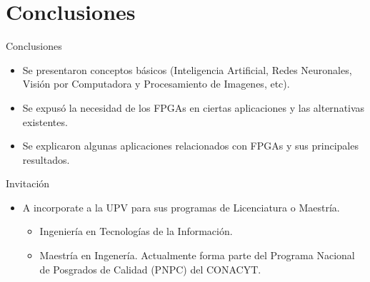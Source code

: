\documentclass[aspectratio=169,compress]{beamer}
\begin{document}












\section{Conclusiones}
\begin{frame}{Conclusiones}
\begin{itemize}
\item Se presentaron conceptos básicos (Inteligencia Artificial, Redes Neuronales, Visión por Computadora y Procesamiento de Imagenes, etc).
\item Se expusó la necesidad de los FPGAs en ciertas aplicaciones y las alternativas existentes. 
\item Se explicaron algunas aplicaciones relacionados con FPGAs y sus principales resultados.
\end{itemize}
\begin{block}{Invitación} 
	\begin{itemize}
\item A incorporate a la UPV para sus programas de Licenciatura o Maestría.
	\begin{itemize}
	\item Ingeniería en Tecnologías de la Información.
	\item Maestría en Ingenería. Actualmente forma parte del Programa Nacional de Posgrados de Calidad (PNPC) del CONACYT.
	\end{itemize}
	\end{itemize}
\end{block}
\end{frame}
\end{document}
